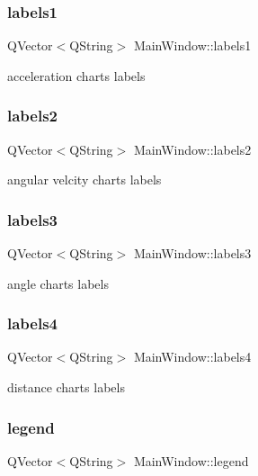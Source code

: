 \subsubsection{labels1}
{\footnotesize\ttfamily Q\+Vector$<$Q\+String$>$ Main\+Window\+::labels1\hspace{0.3cm}{\ttfamily [private]}}

acceleration chart\textquotesingle{}s labels \mbox{\label{class_main_window_a81d3e91905b239abfc54858b2954b7f7}} 
\subsubsection{labels2}
{\footnotesize\ttfamily Q\+Vector$<$Q\+String$>$ Main\+Window\+::labels2\hspace{0.3cm}{\ttfamily [private]}}

angular velcity chart\textquotesingle{}s labels \mbox{\label{class_main_window_ab9b1318826e6722ec4a5dd99cd0ae353}} 
\subsubsection{labels3}
{\footnotesize\ttfamily Q\+Vector$<$Q\+String$>$ Main\+Window\+::labels3\hspace{0.3cm}{\ttfamily [private]}}

angle chart\textquotesingle{}s labels \mbox{\label{class_main_window_a513d5d910d4ece239f1a25d6240869ce}} 
\subsubsection{labels4}
{\footnotesize\ttfamily Q\+Vector$<$Q\+String$>$ Main\+Window\+::labels4\hspace{0.3cm}{\ttfamily [private]}}

distance chart\textquotesingle{}s labels \mbox{\label{class_main_window_a80e2a1a6949dc004e0729bdb133497dd}} 
\subsubsection{legend}
{\footnotesize\ttfamily Q\+Vector$<$Q\+String$>$ Main\+Window\+::legend\hspace{0.3cm}{\ttfamily [private]}}

